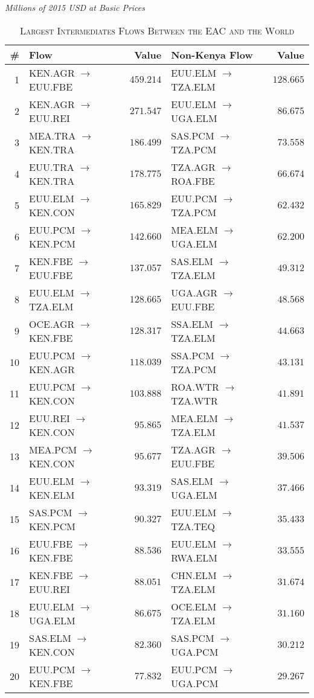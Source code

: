 \documentclass[a4paper]{article}
\begin{document}
\begin{table}[!htbp] \centering 
  \caption{\textsc{Largest Intermediates Flows Between the EAC and the World}} 
  \small{\textit{Millions of 2015 USD at Basic Prices}}
  \label{tab:weaclfl} 
  \vspace{2mm}
\begin{tabular}{rlrlr} \toprule
\textbf{\#} & \textbf{Flow} & \textbf{Value} & \textbf{Non-Kenya Flow} & \textbf{Value} \\ 
\midrule
1 & KEN.AGR $\to$  EUU.FBE & $459.214$ & EUU.ELM $\to$  TZA.ELM & $128.665$ \\ 
2 & KEN.AGR $\to$  EUU.REI & $271.547$ & EUU.ELM $\to$  UGA.ELM & $86.675$ \\ 
3 & MEA.TRA $\to$  KEN.TRA & $186.499$ & SAS.PCM $\to$  TZA.PCM & $73.558$ \\ 
4 & EUU.TRA $\to$  KEN.TRA & $178.775$ & TZA.AGR $\to$  ROA.FBE & $66.674$ \\ 
5 & EUU.ELM $\to$  KEN.CON & $165.829$ & EUU.PCM $\to$  TZA.PCM & $62.432$ \\ 
6 & EUU.PCM $\to$  KEN.PCM & $142.660$ & MEA.ELM $\to$  UGA.ELM & $62.200$ \\ 
7 & KEN.FBE $\to$  EUU.FBE & $137.057$ & SAS.ELM $\to$  TZA.ELM & $49.312$ \\ 
8 & EUU.ELM $\to$  TZA.ELM & $128.665$ & UGA.AGR $\to$  EUU.FBE & $48.568$ \\ 
9 & OCE.AGR $\to$  KEN.FBE & $128.317$ & SSA.ELM $\to$  TZA.ELM & $44.663$ \\ 
10 & EUU.PCM $\to$  KEN.AGR & $118.039$ & SSA.PCM $\to$  TZA.PCM & $43.131$ \\ 
11 & EUU.PCM $\to$  KEN.CON & $103.888$ & ROA.WTR $\to$  TZA.WTR & $41.891$ \\ 
12 & EUU.REI $\to$  KEN.CON & $95.865$ & MEA.ELM $\to$  TZA.ELM & $41.537$ \\ 
13 & MEA.PCM $\to$  KEN.CON & $95.677$ & TZA.AGR $\to$  EUU.FBE & $39.506$ \\ 
14 & EUU.ELM $\to$  KEN.ELM & $93.319$ & SAS.ELM $\to$  UGA.ELM & $37.466$ \\ 
15 & SAS.PCM $\to$  KEN.PCM & $90.327$ & EUU.ELM $\to$  TZA.TEQ & $35.433$ \\ 
16 & EUU.FBE $\to$  KEN.FBE & $88.536$ & EUU.ELM $\to$  RWA.ELM & $33.555$ \\ 
17 & KEN.FBE $\to$  EUU.REI & $88.051$ & CHN.ELM $\to$  TZA.ELM & $31.674$ \\ 
18 & EUU.ELM $\to$  UGA.ELM & $86.675$ & OCE.ELM $\to$  TZA.ELM & $31.160$ \\ 
19 & SAS.ELM $\to$  KEN.CON & $82.360$ & SAS.PCM $\to$  UGA.PCM & $30.212$ \\ 
20 & EUU.PCM $\to$  KEN.FBE & $77.832$ & EUU.PCM $\to$  UGA.PCM & $29.267$ \\ 
\bottomrule
\end{tabular} 
\end{table} 
\end{document}
